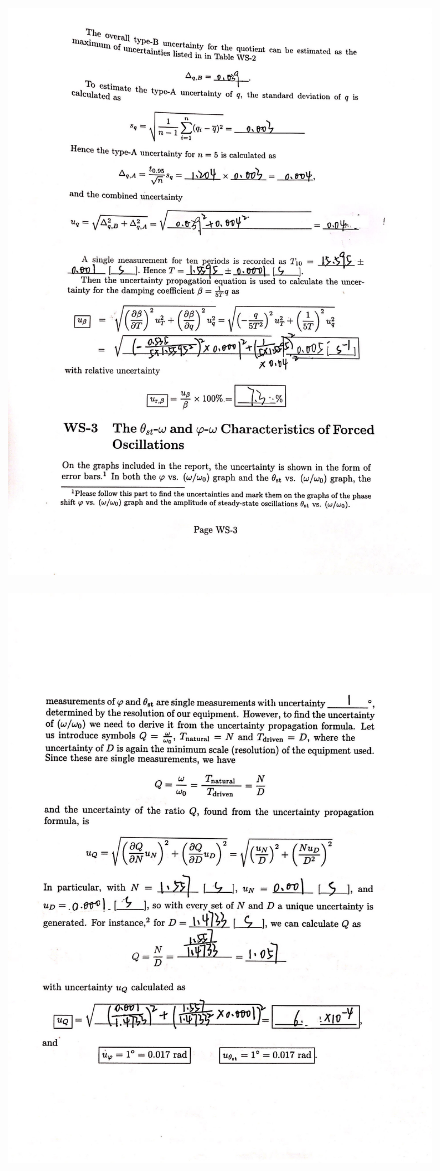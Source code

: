 \documentclass[12pt,a4paper]{article}
\begin{document}
\begin{figure}[t]
    \centering
    \includegraphics[scale=0.25]{newuncer3.jpeg}
\end{figure}
\begin{figure}[t]
    \centering
    \includegraphics[scale=0.25]{uncertainty4.jpg}
\end{figure}
\end{document}
